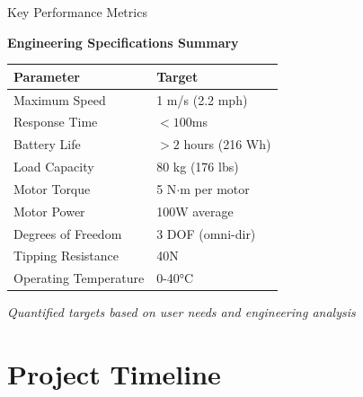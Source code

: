 \documentclass[aspectratio=169]{beamer}
\begin{document}
\begin{frame}{Key Performance Metrics}
\begin{center}
\Large \textbf{Engineering Specifications Summary}

\vspace{0.3cm}
\large
\begin{tabular}{ll}
\toprule
\textbf{Parameter} & \textbf{Target} \\
\midrule
Maximum Speed & 1 m/s (2.2 mph) \\
Response Time & $<100$ms \\
Battery Life & $>2$ hours (216 Wh) \\
Load Capacity & 80 kg (176 lbs) \\
Motor Torque & 5 N$\cdot$m per motor \\
Motor Power & 100W average \\
Degrees of Freedom & 3 DOF (omni-dir) \\
Tipping Resistance & 40N \\
Operating Temperature & 0-40°C \\
\bottomrule
\end{tabular}

\vspace{0.3cm}
\normalsize
\textit{Quantified targets based on user needs and engineering analysis}
\end{center}
\end{frame}

\section{Project Timeline}
\end{document}
